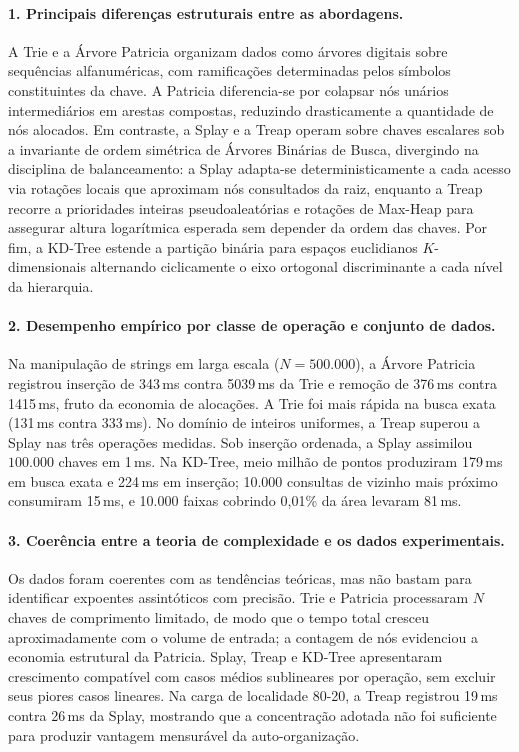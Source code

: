 \documentclass[11pt, a4paper]{article}
\begin{document}
\paragraph{1. Principais diferenças estruturais entre as abordagens.}
A Trie e a Árvore Patricia organizam dados como árvores digitais sobre sequências alfanuméricas, com ramificações determinadas pelos símbolos constituintes da chave. A Patricia diferencia-se por colapsar nós unários intermediários em arestas compostas, reduzindo drasticamente a quantidade de nós alocados. Em contraste, a Splay e a Treap operam sobre chaves escalares sob a invariante de ordem simétrica de Árvores Binárias de Busca, divergindo na disciplina de balanceamento: a Splay adapta-se deterministicamente a cada acesso via rotações locais que aproximam nós consultados da raiz, enquanto a Treap recorre a prioridades inteiras pseudoaleatórias e rotações de Max-Heap para assegurar altura logarítmica esperada sem depender da ordem das chaves. Por fim, a KD-Tree estende a partição binária para espaços euclidianos $K$-dimensionais alternando ciclicamente o eixo ortogonal discriminante a cada nível da hierarquia.

\paragraph{2. Desempenho empírico por classe de operação e conjunto de dados.}
Na manipulação de strings em larga escala ($N = 500.000$), a Árvore Patricia registrou inserção de 343\,ms contra 5039\,ms da Trie e remoção de 376\,ms contra 1415\,ms, fruto da economia de alocações. A Trie foi mais rápida na busca exata (131\,ms contra 333\,ms). No domínio de inteiros uniformes, a Treap superou a Splay nas três operações medidas. Sob inserção ordenada, a Splay assimilou $100.000$ chaves em 1\,ms. Na KD-Tree, meio milhão de pontos produziram 179\,ms em busca exata e 224\,ms em inserção; 10.000 consultas de vizinho mais próximo consumiram 15\,ms, e 10.000 faixas cobrindo 0,01\% da área levaram 81\,ms.

\paragraph{3. Coerência entre a teoria de complexidade e os dados experimentais.}
Os dados foram coerentes com as tendências teóricas, mas não bastam para identificar expoentes assintóticos com precisão. Trie e Patricia processaram $N$ chaves de comprimento limitado, de modo que o tempo total cresceu aproximadamente com o volume de entrada; a contagem de nós evidenciou a economia estrutural da Patricia. Splay, Treap e KD-Tree apresentaram crescimento compatível com casos médios sublineares por operação, sem excluir seus piores casos lineares. Na carga de localidade 80-20, a Treap registrou 19\,ms contra 26\,ms da Splay, mostrando que a concentração adotada não foi suficiente para produzir vantagem mensurável da auto-organização.
\end{document}
